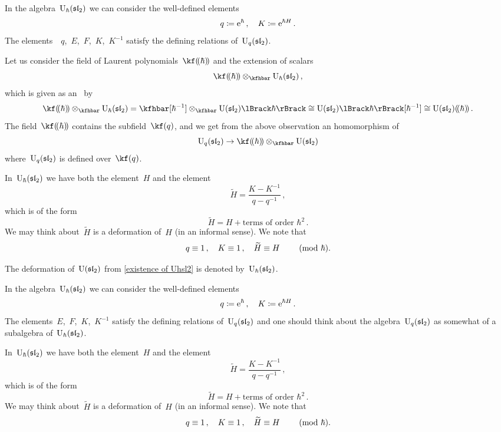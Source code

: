 \documentclass[a4paper, 11pt, oneside]{scrartcl}
\begin{document}
\begin{remark}
  \item
    In the algebra~$\operatorname{U}_{\hbar}(\mathfrak{sl}_2)$ we can consider the well-defined elements
    \[
      q \coloneqq \mathrm{e}^{\hbar} \,,
      \quad
      K \coloneqq \mathrm{e}^{\hbar H} \,.
    \]
    The elements~~$q$,~$E$,~$F$,~$K$,~$K^{-1}$ satisfy the defining relations of~$\operatorname{U}_q(\mathfrak{sl}_2)$.

    Let us consider the field of Laurent polynomials~$\lpower{\kf}{\hbar}$ and the extension of scalars
    \[
      \lpower{\kf}{\hbar} \tensor_{\kfhbar} \Univ_{\hbar}(\sllie_2) \,,
    \]
    which is given as an~\module{$\lpower{\kf}{\hbar}$} by
    \[
      \lpower{\kf}{\hbar} \tensor_{\kfhbar} \Univ_{\hbar}(\sllie_2)
      =
      \kfhbar[\hbar^{-1}] \tensor_{\kfhbar} \power{\Univ(\sllie_2)}{\hbar}
      \cong
      \power{\Univ(\sllie_2)}{\hbar}[\hbar^{-1}]
      \cong
      \lpower{\Univ(\sllie_2)}{\hbar} \,.
    \]
    The field~$\lpower{\kf}{\hbar}$ contains the subfield~$\kf(q)$, and we get from the above observation an homomorphism of~
    \[
      \Univ_q(\sllie_2)
      \to
      \lpower{\kf}{\hbar} \tensor_{\kfhbar} \Univ(\sllie_2)
    \]
    where~$\operatorname{U}_q(\mathfrak{sl}_2)$ is defined over~$\kf(q)$.
  \item
    In~$\operatorname{U}_{\hbar}(\mathfrak{sl}_2)$ we have both the element~$H$ and the element
    \[
      \widetilde{H}
      =
      \frac{K - K^{-1}}{q - q^{-1}} \,,
    \]
    which is of the form
    \[
      \widetilde{H}
      =
      H + \text{terms of order~$\hbar^2$} \,.
    \]
    We may think about~$\widetilde{H}$ is a deformation of~$H$ (in an informal sense).
    We note that
    \[
      q \equiv 1 \,,
      \quad
      K \equiv 1 \,,
      \quad
      \widetilde{H} \equiv H
      \qquad
      \ (\mathrm{mod}\ \hbar).
    \]
\end{remark}

\begin{definition}
  The deformation of~$\operatorname{U}(\mathfrak{sl}_2)$ from \cref{existence of Uhsl2} is denoted by~$\operatorname{U}_{\hbar}(\mathfrak{sl}_2)$.
\end{definition}

\begin{remark}
  In the algebra~$\operatorname{U}_{\hbar}(\mathfrak{sl}_2)$ we can consider the well-defined elements
  \[
    q \coloneqq \mathrm{e}^{\hbar} \,,
    \quad
    K \coloneqq \mathrm{e}^{\hbar H} \,.
  \]
  The elements~$E$,~$F$,~$K$,~$K^{-1}$ satisfy the defining relations of~$\operatorname{U}_q(\mathfrak{sl}_2)$ and one should think about the algebra~$\operatorname{U}_q(\mathfrak{sl}_2)$ as somewhat of a subalgebra of~$\operatorname{U}_{\hbar}(\mathfrak{sl}_2)$.

  In~$\operatorname{U}_{\hbar}(\mathfrak{sl}_2)$ we have both the element~$H$ and the element
  \[
    \widetilde{H}
    =
    \frac{K - K^{-1}}{q - q^{-1}} \,,
  \]
  which is of the form
  \[
    \widetilde{H}
    =
    H + \text{terms of order~$\hbar^2$} \,.
  \]
  We may think about~$\widetilde{H}$ is a deformation of~$H$ (in an informal sense).
  We note that
  \[
    q \equiv 1 \,,
    \quad
    K \equiv 1 \,,
    \quad
    \widetilde{H} \equiv H
    \qquad
    \ (\mathrm{mod}\ \hbar).
  \]
\end{remark}
\end{document}
